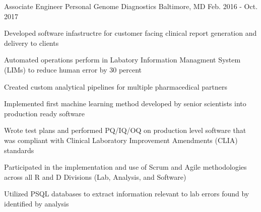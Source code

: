 \begin{cventries}
  \cventry
    {Associate Engineer} %
    {Personal Genome Diagnostics} %
    {Baltimore, MD} %
    {Feb. 2016 - Oct. 2017} %
    {
      \begin{cvitems} %
        \item{Developed software infastructre for customer facing clinical report generation and delivery to clients}
        \item{Automated operations perform in Labatory Information Managment System (LIMs) to reduce human error by 30 percent}
        \item{Created custom analytical pipelines for multiple pharmacedical partners}
        \item{Implemented first machine learning method developed by senior scientists into production ready software}
        \item{Wrote test plans and performed PQ/IQ/OQ on production level software that was compliant with Clinical Laboratory Improvement Amendments (CLIA) standards}
        \item{Participated in the implementation and use of Scrum and Agile methodologies across all R and D Divisions (Lab, Analysis, and Software) }
        \item{Utilized PSQL databases to extract information relevant to lab errors found by identified by analysis}
      \end{cvitems}
    }


\end{cventries}

